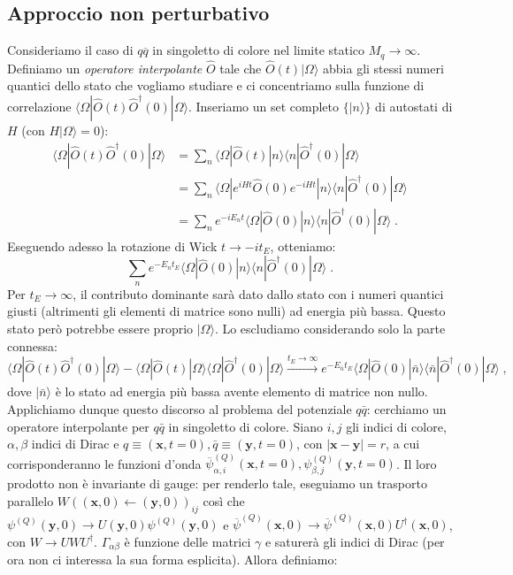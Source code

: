 \documentclass[12pt,a4paper]{article}
\theoremstyle{definition}
\newcommand{\bra}{\langle}
\newcommand{\ket}{\rangle}
\newcommand{\adj}[1]{#1^{\dagger}}
\numberwithin{equation}{section}
\begin{document}
\subsection{Approccio non perturbativo}
Consideriamo il caso di $q\overline{q}$ in singoletto di colore nel limite statico $M_q\to\infty$. Definiamo un \emph{operatore interpolante} $\hat{O}$ tale che $\hat{O}(t)|\Omega\ket$ abbia gli stessi numeri quantici dello stato che vogliamo studiare e ci concentriamo sulla funzione di correlazione $\bra\Omega|\hat{O}(t)\adj{\hat{O}}(0)|\Omega\ket$. Inseriamo un set completo $\{|n\ket\}$ di autostati di $H$ (con $H|\Omega\ket=0$):
\begin{align*}
\bra \Omega|\hat{O}(t)\adj{\hat{O}}(0)|\Omega\ket &= \sum_n\bra\Omega|\hat{O}(t)|n\ket\bra n|\adj{\hat{O}}(0)|\Omega\ket \\
&= \sum_n\bra\Omega|e^{iHt}\hat{O}(0)e^{-iHt}|n\ket\bra n|\adj{\hat{O}}(0)|\Omega\ket \\
&= \sum_n e^{-iE_nt}\bra\Omega|\hat{O}(0)|n\ket\bra n|\adj{\hat{O}}(0)|\Omega\ket\;.
\end{align*}
Eseguendo adesso la rotazione di Wick $t\to -it_E$, otteniamo:
\begin{equation}
\sum_n e^{-E_nt_E}\bra\Omega|\hat{O}(0)|n\ket\bra n|\adj{\hat{O}}(0)|\Omega\ket\;.
\end{equation}
Per $t_E\to\infty$, il contributo dominante sarà dato dallo stato con i numeri quantici giusti (altrimenti gli elementi di matrice sono nulli) ad energia più bassa. Questo stato però potrebbe essere proprio $|\Omega\ket$. Lo escludiamo considerando solo la parte connessa:
\begin{equation}
\bra \Omega|\hat{O}(t)\adj{\hat{O}}(0)|\Omega\ket-\bra\Omega|\hat{O}(t)|\Omega\ket\bra\Omega|\adj{\hat{O}}(0)|\Omega\ket \stackrel{t_E\to\infty}{\longrightarrow} e^{-E_{\bar{n}}t_E}\bra\Omega|\hat{O}(0)|\bar{n}\ket\bra\bar{n}|\adj{\hat{O}}(0)|\Omega\ket\;,
\end{equation}
dove $|\bar{n}\ket$ è lo stato ad energia più bassa avente elemento di matrice non nullo. \\
Applichiamo dunque questo discorso al problema del potenziale $q\bar{q}$: cerchiamo un operatore interpolante per $q\bar{q}$ in singoletto di colore. Siano $i,j$ gli indici di colore, $\alpha,\beta$ indici di Dirac e $q\equiv (\mathbf{x},t=0),\bar{q}\equiv (\mathbf{y},t=0)$, con $|\mathbf{x}-\mathbf{y}|=r$, a cui corrisponderanno le funzioni d'onda $\overline{\psi}_{\alpha,i}^{(Q)}(\mathbf{x},t=0),\psi_{\beta,j}^{(Q)}(\mathbf{y},t=0)$. Il loro prodotto non è invariante di gauge: per renderlo tale, eseguiamo un trasporto parallelo $W((\mathbf{x},0)\longleftarrow(\mathbf{y},0))_{ij}$ così che $\psi^{(Q)}(\mathbf{y},0)\to U(\mathbf{y},0)\psi^{(Q)}(\mathbf{y},0)$ e $\overline{\psi}^{(Q)}(\mathbf{x},0)\to \overline{\psi}^{(Q)}(\mathbf{x},0)\adj{U}(\mathbf{x},0)$, con $W\to UW\adj{U}$. $\Gamma_{\alpha\beta}$ è funzione delle matrici $\gamma$ e saturerà gli indici di Dirac (per ora non ci interessa la sua forma esplicita). Allora definiamo:
\end{document}
